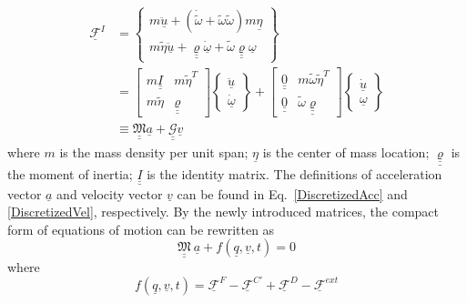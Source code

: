 \documentclass{aiaa-tc}
\newcommand{\tens}[1]{\underline{\underline{#1}}}
\begin{document}
\begin{align}
    \underline{\mathcal{F}}^I &= \begin{Bmatrix}
    m \ddot{\underline{u}} + ( \dot{\tilde{\omega}} + \tilde{\omega} \tilde{\omega} ) m \underline{\eta} \\
    m \tilde{\eta} \ddot{\underline{u}} + \underline{\underline{\varrho}} \dot{\underline{\omega}} + \tilde{\omega}  \underline{\underline{\varrho}} \underline{\omega} 
    \end{Bmatrix} \nonumber \\
    \label{InertialForce2}
    &= \begin{bmatrix}
    m \underline{\underline{I}} & m \tilde{\eta}^T \\
    m \tilde{\eta} & \underline{\underline{\varrho}}
    \end{bmatrix}
    \begin{Bmatrix}
    \ddot{\underline{u}} \\
    \dot{\underline{\omega}}
    \end{Bmatrix} + 
    \begin{bmatrix}
    \underline{\underline{0}} & m \tilde{\omega} \tilde{\eta}^T \\
    \underline{\underline{0}} & \tilde{\omega}  \underline{\underline{\varrho}}
    \end{bmatrix}
    \begin{Bmatrix}
    \dot{\underline{u}} \\
    \underline{\omega}
    \end{Bmatrix} \\
    &  \equiv \underline{\underline{\mathfrak{M}}} \underline{a} + \underline{\underline{\mathcal{G}}} \underline{v}  \nonumber     
\end{align}
where $m$ is the mass density per unit span; $\underline{\eta}$ is the center of mass location;  $\underline{\underline{\varrho}}$ is the moment of inertia; $\tens{I}$ is the identity matrix. The definitions of acceleration vector $\underline{a}$ and velocity vector $\underline{v}$ can be found in Eq.~\eqref{DiscretizedAcc} and \eqref{DiscretizedVel}, respectively. By the newly introduced matrices, the compact form of equations of motion can be rewritten as
\begin{equation}
    \label{CompactForm2}
    \underline{\underline{\mathfrak{M}}}~ \underline{a} + f(\underline{q},\underline{v},t) = 0
\end{equation}
where
\begin{equation}
    \label{CompactForm3}
    f(\underline{q},\underline{v},t) = \underline{\mathcal{F}}^F - \underline{\mathcal{F}}^{C\prime} + \underline{\mathcal{F}}^D - \underline{\mathcal{F}}^{ext}
\end{equation}
\end{document}
